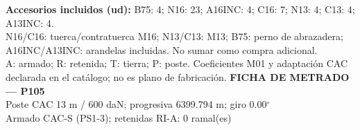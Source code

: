 \begingroup\scriptsize
\textbf{Accesorios incluidos (ud):} B75: 4; N16: 23; A16INC: 4; C16: 7; N13: 4; C13: 4; A13INC: 4.\\
N16/C16: tuerca/contratuerca M16; N13/C13: M13; B75: perno de abrazadera; A16INC/A13INC: arandelas incluidas. No sumar como compra adicional.\\
A: armado; R: retenida; T: tierra; P: poste. Coeficientes M01 y adaptación CAC declarada en el catálogo; no es plano de fabricación.
\endgroup\endgroup
\clearpage{}
\begingroup\small\setlength{\parskip}{3pt}\renewcommand{\arraystretch}{1.05}
\textbf{\large FICHA DE METRADO — P105}\\[4pt]
Poste CAC 13 m / 600 daN; progresiva 6399.794 m; giro 0.00\ensuremath{^\circ}\\
Armado CAC-S (PS1-3); retenidas RI-A: 0 ramal(es)\\
\begingroup\scriptsize
